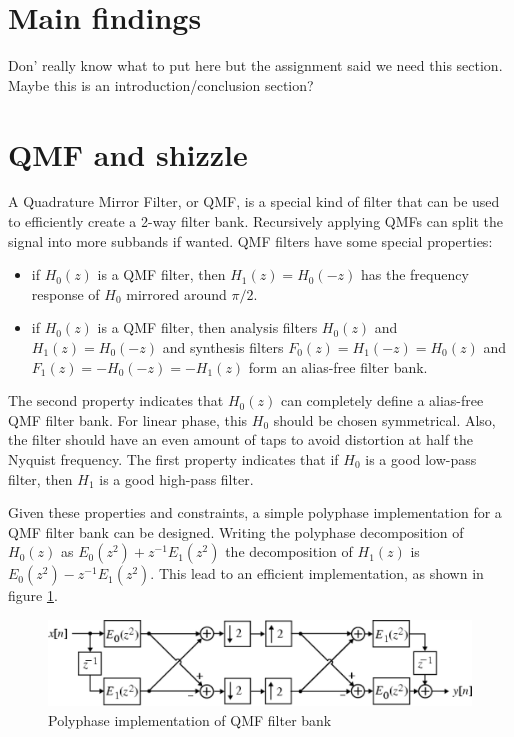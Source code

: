 \documentclass[a4paper]{article}
\begin{document}
\section{Main findings}
Don' really know what to put here but the assignment said we need this section. Maybe this is an introduction/conclusion section?

\section{QMF and shizzle}
A Quadrature Mirror Filter, or QMF, is a special kind of filter that can be used to efficiently create a 2-way filter bank. Recursively applying QMFs can split the signal into more subbands if wanted. QMF filters have some special properties:
\begin{itemize}
\item if $H_0(z)$ is a QMF filter, then $H_1(z) = H_0(-z)$ has the frequency response of $H_0$ mirrored around $\pi/2$.
\item if $H_0(z)$ is a QMF filter, then analysis filters $H_0(z)$ and $H_1(z) = H_0(-z)$ and synthesis filters $F_0(z)=H_1(-z)=H_0(z)$ and $F_1(z)=-H_0(-z) = -H_1(z)$ form an alias-free filter bank.
\end{itemize}
The second property indicates that $H_0(z)$ can completely define a alias-free QMF filter bank. For linear phase, this $H_0$ should be chosen symmetrical. Also, the filter should have an even amount of taps to avoid distortion at half the Nyquist frequency. The first property indicates that if $H_0$ is a good low-pass filter, then $H_1$ is a good high-pass filter.

Given these properties and constraints, a simple polyphase implementation for a QMF filter bank can be designed. Writing the polyphase decomposition of $H_0(z)$ as $E_0(z^2) + z^{-1} E_1(z^2)$ the decomposition of $H_1(z)$ is $E_0(z^2) - z^{-1} E_1(z^2)$. This lead to an efficient implementation, as shown in figure \ref{fig:qmf}.

\begin{figure}[hbt]
\includegraphics[width = \textwidth]{qmf}
\caption{Polyphase implementation of QMF filter bank}
\label{fig:qmf}
\end{figure}
\end{document}
